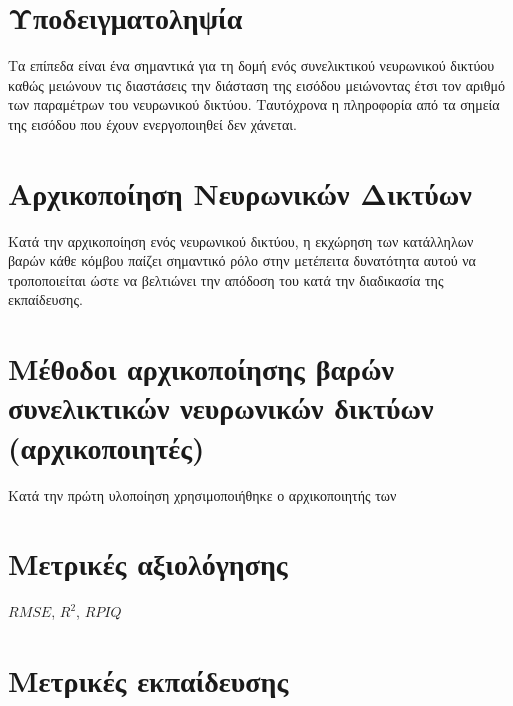 \section{}

\section{Υποδειγματοληψία }
Τα επίπεδα  είναι ένα σημαντικά για τη δομή ενός συνελικτικού νευρωνικού δικτύου καθώς μειώνουν τις διαστάσεις την διάσταση της εισόδου μειώνοντας έτσι τον αριθμό των παραμέτρων του νευρωνικού δικτύου. Ταυτόχρονα η πληροφορία από τα σημεία της εισόδου που έχουν ενεργοποιηθεί δεν χάνεται. 

\section{Αρχικοποίηση Νευρωνικών Δικτύων}

Κατά την αρχικοποίηση ενός νευρωνικού δικτύου, η εκχώρηση των κατάλληλων βαρών κάθε κόμβου παίζει σημαντικό ρόλο στην μετέπειτα δυνατότητα αυτού να τροποποιείται ώστε να βελτιώνει την απόδοση του κατά την διαδικασία της εκπαίδευσης.

\section{Μέθοδοι αρχικοποίησης βαρών συνελικτικών νευρωνικών δικτύων (αρχικοποιητές)}
Κατά την πρώτη υλοποίηση χρησιμοποιήθηκε ο αρχικοποιητής των 

\section{Μετρικές αξιολόγησης}
$RMSE$, ${R^2}$, $RPIQ$ 

\section{Μετρικές εκπαίδευσης}

\section{}

